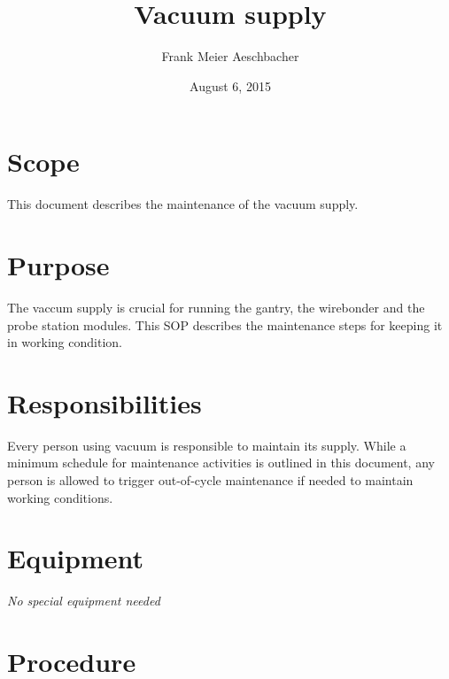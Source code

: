 \documentclass[12pt]{unlsilabsop}
\title{Vacuum supply}
\date{August 6, 2015}
\author{Frank Meier Aeschbacher}
\begin{document}
\maketitle

\section{Scope}
This document describes the maintenance of the vacuum supply.

\section{Purpose}
The vaccum supply is crucial for running the gantry, the wirebonder and the probe station modules. This SOP describes the maintenance steps for keeping it in working condition.


\section{Responsibilities}
Every person using vacuum is responsible to maintain its supply. While a minimum schedule for maintenance activities is outlined in this document, any person is allowed to trigger out-of-cycle maintenance if needed to maintain working conditions.

\section{Equipment}

\emph{No special equipment needed}


\section{Procedure}
\end{document}
